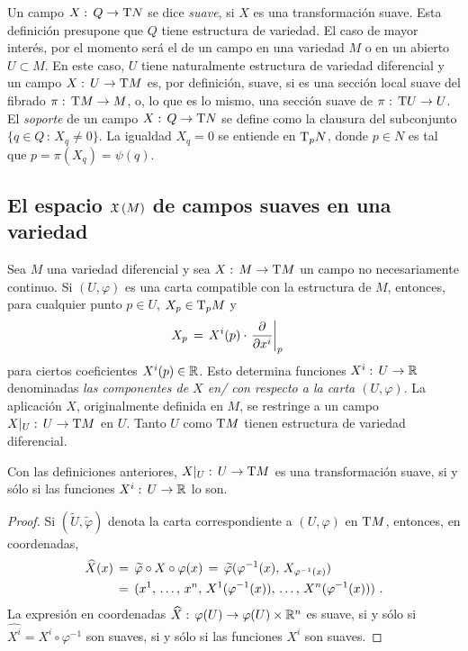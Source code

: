Un campo $X:\,Q\rightarrow\tangente{N}$ se dice \emph{suave}, si $X$
es una transformaci\'{o}n suave. Esta definici\'{o}n presupone que $Q$ tiene
estructura de variedad. El caso de mayor inter\'{e}s, por el momento
ser\'{a} el de un campo en una variedad $M$ o en un abierto $U\subset M$.
En este caso, $U$ tiene naturalmente estructura de variedad diferencial y
un campo $X:\,U\rightarrow\tangente{M}$ es, por definici\'{o}n, suave, si
es una secci\'{o}n local suave del fibrado $\pi:\,\tangente{M}\rightarrow M$,
o, lo que es lo mismo, una secci\'{o}n suave de $\pi:\,%
\tangente{U}\rightarrow U$. El \emph{soporte} de un campo
$X:\,Q\rightarrow\tangente{N}$ se define como la clausura del subconjunto
$\{q\in Q\,:\,X_{q}\not =0\}$. La igualdad $X_{q}=0$ se entiende en
$\tangente[p]{N}$, donde $p\in N$ es tal que $p=\pi(X_{q})=\psi(q)$.

\subsection{El espacio $\mathfrak{X}\left(M\right)$ de campos suaves en una variedad}
Sea $M$ una variedad diferencial y sea $X:\,M\rightarrow\tangente{M}$
un campo no necesariamente continuo. Si $(U,\varphi)$ es una carta
compatible con la estructura de $M$, entonces, para cualquier punto
$p\in U$, $X_{p}\in\tangente[p]{M}$ y
\begin{align*}
	X_{p} & \,=\,X^{i}(p)\cdot\gancho[p]{x^{i}}
\end{align*}
%
para ciertos coeficientes $X^{i}(p)\in\mathbb{R}$. Esto determina funciones
$X^{i}:\,U\rightarrow\mathbb{R}$ denominadas \emph{las componentes de $X$ en/%
con respecto a la carta $(U,\varphi)$}. La aplicaci\'{o}n $X$, originalmente
definida en $M$, se restringe a un campo $X|_{U}:\,%
U\rightarrow\tangente{M}$ en $U$. Tanto $U$ como $\tangente{M}$
tienen estructura de variedad diferencial.

\begin{propoCamposEnCoordenadas}\label{thm:camposencoordenadas}
	Con las definiciones anteriores, $X|_{U}:\,U\rightarrow\tangente{M}$
	es una transformaci\'{o}n suave, si y s\'{o}lo si
	las funciones $X^{i}:\,U\rightarrow\mathbb{R}$ lo son.
\end{propoCamposEnCoordenadas}

\begin{proof}
	Si $(\widetilde{U},\widetilde{\varphi})$ denota la carta
	correspondiente a $(U,\varphi)$ en $\tangente{M}$, entonces, en
	coordenadas,
	\begin{align*}
		\widehat{X}(x) & \,=\,
			\widetilde{\varphi}\circ X\circ\varphi(x)\,=\,
			\widetilde{\varphi}
				(\varphi^{-1}(x),\,X_{\varphi^{-1}(x)}) \\
		& \,=\,(\lista*{x}{n},\,X^{1}(\varphi^{-1}(x)),\,\dots,\,
			X^{n}(\varphi^{-1}(x)))
		\text{ .}
	\end{align*}
	La expresi\'{o}n en coordenadas $\widehat{X}:\,%
	\varphi(U)\rightarrow\varphi(U)\times\bb{R}^{n}$ es suave, si y
	s\'{o}lo si $\widehat{X^{i}}=X^{i}\circ\varphi^{-1}$ son suaves,
	si y s\'{o}lo si las funciones $X^{i}$ son suaves.
\end{proof}

